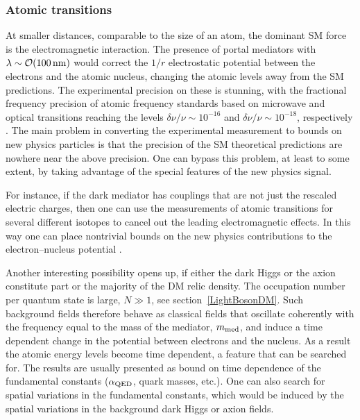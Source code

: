 \subsubsection{Atomic transitions} 
At smaller distances,  comparable to the size of an atom, the dominant SM force is the electromagnetic interaction. 
The presence of portal mediators with   $\lambda\sim {\mathcal O}(100\, {\rm nm})$ would correct the $1/r$ electrostatic potential between the electrons and the atomic nucleus, changing the atomic levels away from the SM predictions. 
The experimental precision on these is stunning, with the fractional frequency precision of atomic frequency standards based on microwave and optical transitions reaching the levels $\delta \nu /\nu\sim 10^{-16}$ and $\delta \nu/\nu \sim 10^{-18}$, respectively \cite{AMO:dark:sector}.  The main problem in converting the experimental measurement to bounds on new physics particles is that the precision of the SM theoretical predictions are nowhere near the above precision. One can bypass this problem, at least to some extent, by taking advantage of the special features of the new physics signal. 

For instance, if the dark mediator has couplings that are not just the rescaled electric charges, then one can use the measurements of atomic transitions for several different isotopes to cancel out the leading electromagnetic effects. In this way one can place nontrivial bounds on the new physics contributions to the electron--nucleus potential \cite{isotopic:shift}.

Another interesting possibility opens up, if either the dark Higgs or the axion constitute part or the majority of the DM relic density. The occupation number per quantum state is large, $N\gg 1$, see section~\ref{LightBosonDM}.
Such background fields therefore behave as classical fields that oscillate coherently with the frequency equal to the mass of the mediator, $m_{\rm med}$, and induce a time dependent change in the potential between electrons and the nucleus. As a result the atomic energy levels become time dependent, a feature that can be searched for. The results are usually {presented} as bound on time dependence of the fundamental constants ($\alpha_{\rm QED}$, quark masses, etc.).
One can also search for spatial variations in the fundamental constants, which would be induced by the spatial variations in the background dark Higgs or axion fields. 


